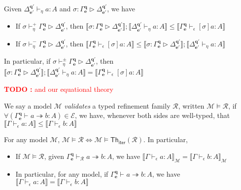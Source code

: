 \documentclass[acmsmall,screen,review]{acmart}
\newcounter{todos}
\newcommand{\TODO}[1]{{
  \stepcounter{todos}
  \begin{center}\large{\textcolor{red}{\textbf{TODO \arabic{todos}:} #1}}\end{center}
}}
\newcommand{\mc}[1]{\ensuremath{\mathcal{#1}}}
\newcommand{\mb}[1]{\ensuremath{\mathbf{#1}}}
\newcommand{\ms}[1]{\ensuremath{\mathsf{#1}}}
\newcommand{\hasty}[4]{#1 \vdash_{#2} #3: {#4}}
\newcommand{\issubst}[3]{#1: #2 \rhd #3}
\newcommand{\csubst}[5]{#1 \vdash_{#4}^{#5} #2 \rhd #3}
\newcommand{\tref}{\twoheadrightarrow}
\newcommand{\tmle}[5]{#1 \vdash_{#2} #3 \tref #4 : {#5}}
\newcommand{\dnt}[1]{\llbracket{#1}\rrbracket}
\newcommand{\thsubiter}[1]{\ms{Th}_{\ms{iter}}(#1)}
\begin{document}
\begin{lemma}
  Given 
  $\hasty{\Delta^{\mb{q}'}_{\mb{e}'}}{\eta}{a}{A}$ and 
  $\issubst{\sigma}{\Gamma^{\mb{q}}_{\mb{e}}}{\Delta^{\mb{q}'}_{\mb{e}'}}$, we have
  \begin{itemize}
    \item If $\csubst{\sigma}{\Gamma^{\mb{q}}_{\mb{e}}}{\Delta^{\mb{q}'}_{\mb{e}'}}{\eta}{+}$, then
    $
    \dnt{\issubst{\sigma}{\Gamma^{\mb{q}}_{\mb{e}}}{\Delta^{\mb{q}'}_{\mb{e}'}}}
    ; \dnt{\hasty{\Delta^{\mb{q}'}_{\mb{e}'}}{\eta}{a}{A}}
    \leq \dnt{\hasty{\Gamma^{\mb{q}}_{\mb{e}}}{\epsilon}{[\sigma]a}{A}}
    $
    \item If $\csubst{\sigma}{\Gamma^{\mb{q}}_{\mb{e}}}{\Delta^{\mb{q}'}_{\mb{e}'}}{\eta}{-}$, then
    $
    \dnt{\hasty{\Gamma^{\mb{q}}_{\mb{e}}}{\epsilon}{[\sigma]a}{A}}
    \leq \dnt{\issubst{\sigma}{\Gamma^{\mb{q}}_{\mb{e}}}{\Delta^{\mb{q}'}_{\mb{e}'}}}
    ; \dnt{\hasty{\Delta^{\mb{q}'}_{\mb{e}'}}{\eta}{a}{A}}
    $
  \end{itemize}
  In particular, if 
  $\csubst{\sigma}{\Gamma^{\mb{q}}_{\mb{e}}}{\Delta^{\mb{q}'}_{\mb{e}'}}{\eta}{\pm}$, then
  $
  \dnt{\issubst{\sigma}{\Gamma^{\mb{q}}_{\mb{e}}}{\Delta^{\mb{q}'}_{\mb{e}'}}}
  ; \dnt{\hasty{\Delta^{\mb{q}'}_{\mb{e}'}}{\eta}{a}{A}}
  = \dnt{\hasty{\Gamma^{\mb{q}}_{\mb{e}}}{\epsilon}{[\sigma]a}{A}}
  $
\end{lemma}

\TODO{and our equational theory}

\begin{definition}
  We say a model $\mc{M}$ \emph{validates} a typed refinement family $\mc{R}$, written $\mc{M}
  \models \mc{R}$, if
  $
  \forall (\tmle{\Gamma^{\mb{q}}_{\mb{e}}}{}{a}{b}{A}) \in \mc{E}
  $, we have, whenever both sides are well-typed, that
  $
  \dnt{\hasty{\Gamma}{\epsilon}{a}{A}} \leq \dnt{\hasty{\Gamma}{\epsilon}{b}{A}}
  $
\end{definition}

\begin{theorem}[name=Soundness, restate=soundnessiter]
  For any model $\mc{M}$, $\mc{M} \models \mc{R} \iff \mc{M} \models \thsubiter{\mc{R}}$. In
  particular,
  \begin{itemize}
    \item If $\mc{M} \models \mc{R}$, given $\tmle{\Gamma^{\mb{q}}_{\mb{e}}}{\mc{R}}{a}{b}{A}$, we
    have $\dnt{\hasty{\Gamma}{\epsilon}{a}{A}}_{\mc{M}} =
    \dnt{\hasty{\Gamma}{\epsilon}{b}{A}}_{\mc{M}}$
    \item In particular, for any model, if $\tmle{\Gamma^{\mb{q}}_{\mb{e}}}{}{a}{b}{A}$, we have
    $\dnt{\hasty{\Gamma}{\epsilon}{a}{A}} = \dnt{\hasty{\Gamma}{\epsilon}{b}{A}}$
  \end{itemize}
\end{theorem}
\end{document}
